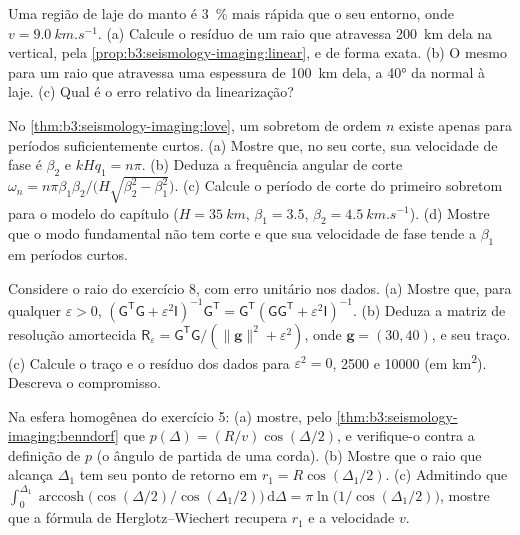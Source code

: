 \begin{exercise}[$\star\star$]\label{exo:b3:seismology-imaging:9}
Uma região de laje do manto é \qty{3}{\percent} mais rápida que o seu entorno,
onde $v = \qty{9.0}{km.s^{-1}}$. (a) Calcule o resíduo de um raio que atravessa
\qty{200}{km} dela na vertical, pela \cref{prop:b3:seismology-imaging:linear},
e de forma exata. (b) O mesmo para um raio que atravessa uma espessura de \qty{100}{km} dela, a
\ang{40} da normal à laje. (c) Qual é o erro relativo da
linearização?
\end{exercise}

\begin{exercise}[$\star\star\star$]\label{exo:b3:seismology-imaging:10}
No \cref{thm:b3:seismology-imaging:love}, um sobretom de ordem $n$ existe apenas
para períodos suficientemente curtos. (a) Mostre que, no seu corte, sua velocidade de fase é
$\beta_2$ e $kHq_1 = n\pi$. (b) Deduza a frequência angular de corte
$\omega_n = n\pi\beta_1\beta_2/\bigl(H\sqrt{\beta_2^2 - \beta_1^2}\bigr)$.
(c) Calcule o período de corte do primeiro sobretom para o modelo do capítulo
($H = \qty{35}{km}$, $\beta_1 = 3.5$, $\beta_2 = \qty{4.5}{km.s^{-1}}$).
(d) Mostre que o modo fundamental não tem corte e que sua velocidade de fase
tende a $\beta_1$ em períodos curtos.
\end{exercise}

\begin{exercise}[$\star\star\star$]\label{exo:b3:seismology-imaging:11}
Considere o raio do exercício 8, com erro unitário nos dados. (a) Mostre que, para qualquer
$\varepsilon > 0$, $(\mathsf G^{\mathsf T}\mathsf G + \varepsilon^2\mathsf
I)^{-1}\mathsf G^{\mathsf T} = \mathsf G^{\mathsf T}(\mathsf G\mathsf
G^{\mathsf T} + \varepsilon^2\mathsf I)^{-1}$. (b) Deduza a
matriz de resolução amortecida $\mathsf R_\varepsilon = \mathsf G^{\mathsf T}\mathsf G/(\|\mathbf g\|^2 +
\varepsilon^2)$, onde $\mathbf g = (30, 40)$, e seu traço. (c) Calcule o
traço e o resíduo dos dados para $\varepsilon^2 = 0$, 2500 e \num{10000}
(em \unit{km^2}). Descreva o compromisso.
\end{exercise}

\begin{exercise}[$\star\star\star$]\label{exo:b3:seismology-imaging:12}
Na esfera homogênea do exercício 5: (a) mostre, pelo
\cref{thm:b3:seismology-imaging:benndorf} que $p(\Delta) = (R/v)\cos(\Delta/2)$,
e verifique-o contra a definição de $p$ (o ângulo de partida de uma corda).
(b) Mostre que o raio que alcança $\Delta_1$ tem seu ponto de retorno em $r_1 = R\cos(\Delta_1/2)$.
(c) Admitindo que $\int_0^{\Delta_1}\operatorname{arccosh}\bigl(\cos(\Delta/2)
/\cos(\Delta_1/2)\bigr)\,\mathrm d\Delta = \pi\ln\bigl(1/\cos(\Delta_1/2)\bigr)$,
mostre que a fórmula de Herglotz--Wiechert recupera $r_1$ e a velocidade $v$.
\end{exercise}

